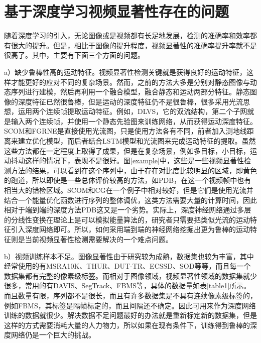 \section{基于深度学习视频显著性存在的问题}

随着深度学习的引入，无论图像或是视频都有长足地发展，检测的准确率和效率都有很大的提升。但是，相比于图像的提升程度，视频显著性的准确率提升率就不是很高了。其中，主要有下面三个方面的问题。

a）缺少鲁棒性高的运动特征。视频显著性检测关键就是获得良好的运动特征，这样才能更好的应对不同的复杂场景。然而，之前的方法大多是分别对静态图像与动态序列进行建模，然后再利用一个融合模型，融合静态和运动两部分特征。静态图像的深度特征已然很鲁棒，但是运动的深度特征仍不是很鲁棒，很多采用光流思想，运用两个连续帧提取运动特征。例如，DLVS，它的双流结构，第二个子网就是输入两个连续帧，并使用一个静态先验图来训练网络，从而获得运动深度特征。SCOM\cite{Chen2018TIP}和FGRNE\cite{li2018flow}是直接使用光流图，只是使用方法各有不同，前者加入测地线距离来建立优化模型，而后者结合LSTM模型和光流图来完成运动特征的提取。虽然这些方法都在一定程度上取得了成果，但是在复杂场景，例如多目标，小目标，运动抖动这样的情况下，表现不是很好。图\ref{example}中，这些是一些视频显著性检测方法的结果，可以看到在这个序列中，由于存在对比度比较明显的区域，即黄色的跑道，所以即使是一些总体评价较高的方法，如PDB，在这一个视频帧中也有相当大的错检区域。SCOM和CG在一个例子中相对较好，但是它们是使用光流并结合一个能量优化函数进行序列的整体调优，这类方法需要大量的计算时间，因此相对于端到端的深度方法PDB这又是一个劣势。实际上，深度神经网络通过多层的分线性变换在理论上是可以模拟能量算法的，研究者只需要把类似光流的运动特征引入深度网络即可。所以，如何采用端到端的神经网络挖掘出更为鲁棒的运动特征则是当前视频显著性检测需要解决的一个难点问题。

b）视频训练样本不足。图像显著性由于研究较为成熟，数据集也较为丰富，其中经常使用的有MSRA10K、THUR、DUT-TR、ECSSD、SOD等等，而且每一个数据集都有完整的像素级标签。而相对于图像领域，视频显著性领域的数据集就少很多，常用的有DAVIS、SegTrack、FBMS等，具体的数据量如表\ref{table1}所示。而且数量有限，序列都不是很长，而且有许多数据集是不具有连续像素级标签的，例如FBMS，其标签是隔帧标定的，而且间隔还不确定。因此可用来作为深度网络训练的数据就很少。解决数据不足问题最好的办法就是重新标定新的数据集，但是这样的方式需要消耗大量的人力物力，所以如果在现有条件下，训练得到鲁棒的深度网络仍是一个巨大的挑战。

